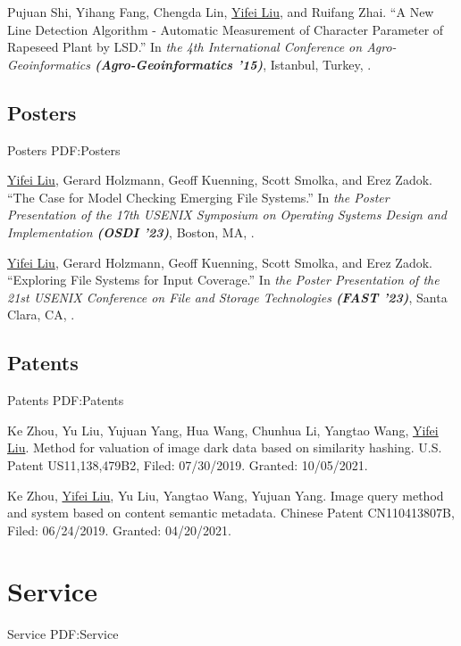 \documentclass[letterpaper,10pt,oneside]{article}
\begin{document}
\begin{body}
\NumberedItem{[9]}
Pujuan Shi, Yihang Fang, Chengda Lin, \underline{Yifei Liu}, and Ruifang Zhai.
``A New Line Detection Algorithm - Automatic Measurement of Character Parameter of Rapeseed Plant by LSD.''
In \textit{the 4th International Conference on Agro-Geoinformatics \textbf{(Agro-Geoinformatics '15)}}, Istanbul, Turkey,
. 

\subsection
{Posters}
{Posters}
{PDF:Posters}

\NumberedItem{[1]}
\underline{Yifei Liu}, Gerard Holzmann, Geoff Kuenning, Scott Smolka, and Erez Zadok.
``The Case for Model Checking Emerging File Systems.''
In \textit{the Poster Presentation of the 17th USENIX Symposium on Operating Systems Design and Implementation \textbf{(OSDI '23)}}, Boston, MA,
.


\NumberedItem{[2]}
\underline{Yifei Liu}, Gerard Holzmann, Geoff Kuenning, Scott Smolka, and Erez Zadok.
``Exploring File Systems for Input Coverage.''
In \textit{the Poster Presentation of the 21st USENIX Conference on File and Storage Technologies \textbf{(FAST '23)}}, Santa Clara, CA,
.

\subsection
{Patents}
{Patents}
{PDF:Patents}

\NumberedItem{[1]}
Ke Zhou, Yu Liu, Yujuan Yang, Hua Wang, Chunhua Li, Yangtao Wang, \underline{Yifei Liu}. Method for valuation of image dark data based on similarity hashing. U.S. Patent US11,138,479B2, Filed: 07/30/2019. Granted: 10/05/2021.

\Gap

\NumberedItem{[2]}
Ke Zhou, \underline{Yifei Liu}, Yu Liu, Yangtao Wang, Yujuan Yang. Image query method and system based on content semantic metadata. Chinese Patent CN110413807B, Filed: 06/24/2019. Granted: 04/20/2021.

\section
{Service}
{Service}
{PDF:Service}


\end{body}
\end{document}
